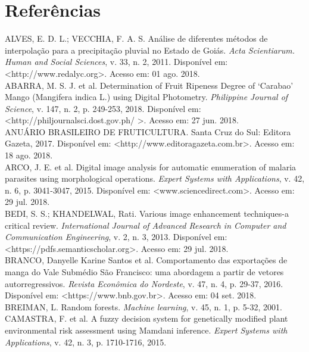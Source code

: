 \chapter{Referências}

\noindent ALVES, E. D. L.; VECCHIA, F. A. S. Análise de diferentes métodos de interpolação para a precipitação pluvial no Estado de Goiás. \textit{Acta Scientiarum. Human and Social Sciences}, v. 33, n. 2, 2011. Disponível em: <http://www.redalyc.org>. Acesso em: 01 ago. 2018.
\\

\noindent ABARRA, M. S. J. et al. Determination of Fruit Ripeness Degree of ‘Carabao’ Mango (Mangifera indica L.) using Digital Photometry. \textit{Philippine Journal of Science}, v. 147, n. 2, p. 249-253, 2018. Disponível em: <http://philjournalsci.dost.gov.ph/ >. Acesso em: 27 jun. 2018.
\\

\noindent ANUÁRIO BRASILEIRO DE FRUTICULTURA. Santa Cruz do Sul: Editora Gazeta, 2017. Disponível em: <http://www.editoragazeta.com.br>. Acesso em: 18 ago. 2018.
\\

\noindent ARCO, J. E. et al. Digital image analysis for automatic enumeration of malaria parasites using morphological operations. \textit{Expert Systems with Applications}, v. 42, n. 6, p. 3041-3047, 2015. Disponível em: <www.sciencedirect.com>. Acesso em: 29 jul. 2018.
\\

\noindent BEDI, S. S.; KHANDELWAL, Rati. Various image enhancement techniques-a critical review. \textit{International Journal of Advanced Research in Computer and Communication Engineering}, v. 2, n. 3, 2013. Disponível em: <https://pdfs.semanticscholar.org>. Acesso em: 29 jul. 2018.
\\

\noindent BRANCO, Danyelle Karine Santos et al. Comportamento das exportações de manga do Vale Submédio São Francisco: uma abordagem a partir de vetores autorregressivos. \textit{Revista Econômica do Nordeste}, v. 47, n. 4, p. 29-37, 2016. Disponível em: <https://www.bnb.gov.br>. Acesso em: 04 set. 2018.
\\

\noindent BREIMAN, L. Random forests. \textit{Machine learning}, v. 45, n. 1, p. 5-32, 2001.
\\

\noindent CAMASTRA, F. et al. A fuzzy decision system for genetically modified plant environmental risk assessment using Mamdani inference. \textit{Expert Systems with Applications}, v. 42, n. 3, p. 1710-1716, 2015.
\\

